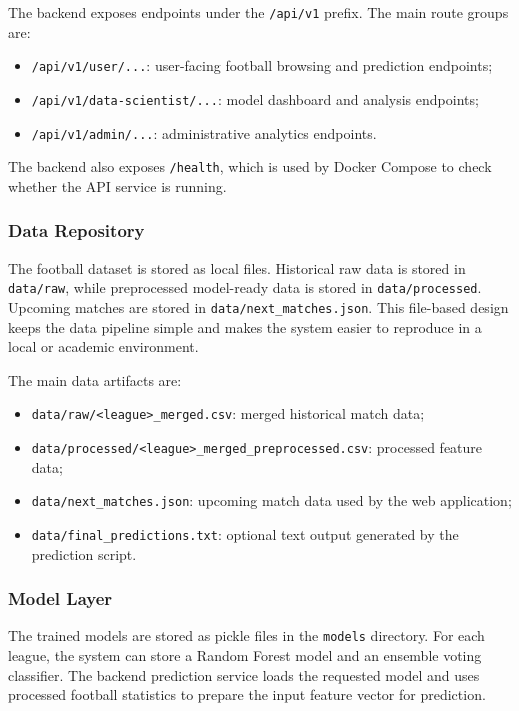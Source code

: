 The backend exposes endpoints under the \texttt{/api/v1} prefix. The main route groups are:

\begin{itemize}
    \item \texttt{/api/v1/user/...}: user-facing football browsing and prediction endpoints;
    \item \texttt{/api/v1/data-scientist/...}: model dashboard and analysis endpoints;
    \item \texttt{/api/v1/admin/...}: administrative analytics endpoints.
\end{itemize}

The backend also exposes \texttt{/health}, which is used by Docker Compose to check whether the API service is running.

\subsubsection{Data Repository}

The football dataset is stored as local files. Historical raw data is stored in \texttt{data/raw}, while preprocessed model-ready data is stored in \texttt{data/processed}. Upcoming matches are stored in \texttt{data/next\_matches.json}. This file-based design keeps the data pipeline simple and makes the system easier to reproduce in a local or academic environment.

The main data artifacts are:

\begin{itemize}
    \item \texttt{data/raw/<league>\_merged.csv}: merged historical match data;
    \item \texttt{data/processed/<league>\_merged\_preprocessed.csv}: processed feature data;
    \item \texttt{data/next\_matches.json}: upcoming match data used by the web application;
    \item \texttt{data/final\_predictions.txt}: optional text output generated by the prediction script.
\end{itemize}

\subsubsection{Model Layer}

The trained models are stored as pickle files in the \texttt{models} directory. For each league, the system can store a Random Forest model and an ensemble voting classifier. The backend prediction service loads the requested model and uses processed football statistics to prepare the input feature vector for prediction.

